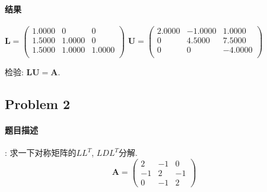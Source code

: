 \documentclass{article}
\begin{document}
\begin{CJK*}{UTF8}{song}
			\paragraph{结果}
				$\mathbf{L} = \left(\begin{matrix}
				 1.0000   &      0     &    0 \\
				1.5000  &  1.0000     &    0 \\
				1.5000  &  1.0000  &  1.0000 \\
				\end{matrix}\right)$
				$\mathbf{U} = \left(\begin{matrix}
				   2.0000  & -1.0000   & 1.0000 \\
				0   & 4.5000  &  7.5000 \\
				0    &     0  & -4.0000 \\
				\end{matrix}\right)$
				
				检验: $\mathbf{LU} = \mathbf{A}$.
		\subsection{Problem 2}
			\paragraph{题目描述}
			:\newline
				求一下对称矩阵的$LL^T$, $LDL^T$分解.
				$$ \mathbf{A} = 
				\left(
				\begin{matrix}
				2 & -1 & 0 \\
				-1 &  2 & -1 \\
				0 &  -1 & 2
				\end{matrix}
				\right)$$

\end{CJK*}
\end{document}
